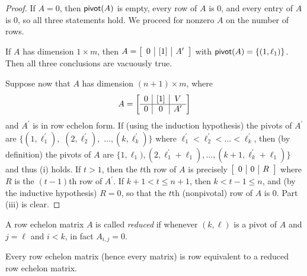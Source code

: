 \documentclass{memoir}
\begin{document}
\begin{proof}
If $A = 0$, then $\mathsf{pivot}(A)$ is empty, every row of $A$ is 0, and every entry of $A$ is 0, so all three statements hold. We proceed for nonzero $A$ on the number of rows.

If $A$ has dimension $1 \times m$, then $A = \left[ \begin{array}{c|c|c} 0 & [1] & A^\prime \end{array} \right]$ with $\mathsf{pivot}(A) = \{(1,\ell_1)\}$. Then all three conclusions are vacuously true.

Suppose now that $A$ has dimension $(n+1) \times m$, where \[ A = \left[ \begin{array}{c|c|c} 0 & [1] & V \\ \hline 0 & 0 & A^\prime \end{array} \right] \] and $A^\prime$ is in row echelon form. If (using the induction hypothesis) the pivots of $A^\prime$ are $\{(1,\ell_1^\prime),$ $(2,\ell_2^\prime),$ $\ldots, (k,\ell_k^\prime)\}$ where $\ell_1^\prime < \ell_2^\prime < \ldots < \ell_k^\prime$, then (by definition) the pivots of $A$ are $\{1,\ell_1), (2,\ell_1^\prime + \ell_1), \ldots, (k+1, \ell_k^\prime + \ell_1)\}$ and thus (i) holds. If $t > 1$, then the $t$th row of $A$ is precisely $\left[ \begin{array}{c|c|c} 0 & 0 & R \end{array} \right]$ where $R$ is the $(t-1)$th row of $A^\prime$. If $k+1 < t \leq n+1$, then $k < t-1 \leq n$, and (by the inductive hypothesis) $R = 0$, so that the $t$th (nonpivotal) row of $A$ is 0. Part (iii) is clear.
\end{proof}

\begin{dfn}
A row echelon matrix $A$ is called \emph{reduced} if whenever $(k,\ell)$ is a pivot of $A$ and $j = \ell$ and $i < k$, in fact $A_{i,j} = 0$.
\end{dfn}

\begin{prp}
Every row echelon matrix (hence every matrix) is row equivalent to a reduced row echelon matrix.
\end{prp}
\end{document}
